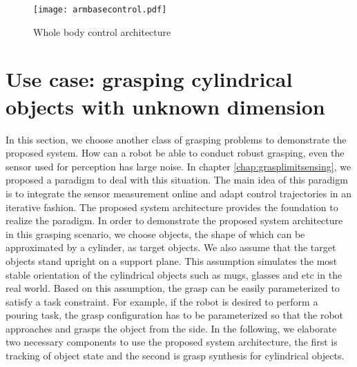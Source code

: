 \begin{figure}[!htbp]
\centering
\texttt{[image: armbasecontrol.pdf]}
\captionsetup{justification=raggedright}
\caption{Whole body control architecture}
\label{fig:coordinated_control}       %
\end{figure}   



\section{Use case: grasping cylindrical objects with unknown dimension}
In this section, we choose another class of grasping problems to demonstrate the proposed system. How can a robot be able to conduct robust grasping, even the sensor used for perception has large noise. In chapter \ref{chap:grasplimitsensing}, we proposed a paradigm to deal with this situation. The main idea of this paradigm is to integrate the sensor measurement online and adapt control trajectories in an iterative fashion. The proposed system architecture provides the foundation to realize the paradigm. In order to demonstrate the proposed system architecture in this grasping scenario, we choose objects, the shape of which can be approximated by a cylinder, as target objects. We also assume that the target objects stand  upright on a support plane. This assumption simulates the most stable orientation of the cylindrical objects such as mugs, glasses and etc in the real world. 
Based on this assumption, the grasp can be easily parameterized to satisfy a task constraint. For example, if the robot is desired to perform a pouring task, the grasp configuration has to be parameterized so that the robot approaches and grasps the object from the side. In the following, we elaborate two necessary components to use the proposed system architecture, the first is tracking of object state and the second is grasp synthesis for cylindrical objects.   
 


